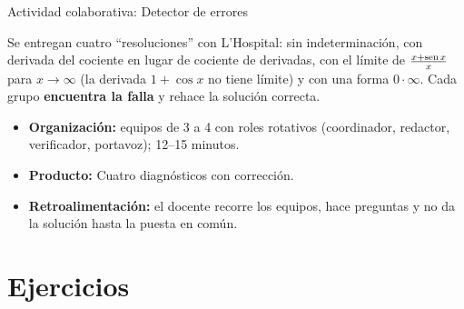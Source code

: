 \documentclass[10pt,aspectratio=169]{beamer}
\begin{document}
\begin{frame}{Actividad colaborativa: Detector de errores}
  \small
  \begin{activa}
    Se entregan cuatro ``resoluciones'' con L'Hospital: sin indeterminación, con derivada del cociente en lugar de cociente de derivadas, con el límite de $\frac{x+\operatorname{sen} x}{x}$ para $x\to\infty$ (la derivada $1+\cos x$ no tiene límite) y con una forma $0\cdot\infty$. Cada grupo \textbf{encuentra la falla} y rehace la solución correcta.
  \end{activa}
  \begin{itemize}
    \item \textbf{Organización:} equipos de 3 a 4 con roles rotativos (coordinador, redactor, verificador, portavoz); 12--15 minutos.
    \item \textbf{Producto:} Cuatro diagnósticos con corrección.
    \item \textbf{Retroalimentación:} el docente recorre los equipos, hace preguntas y no da la solución hasta la puesta en común.
  \end{itemize}
\end{frame}

\section{Ejercicios}
\end{document}
